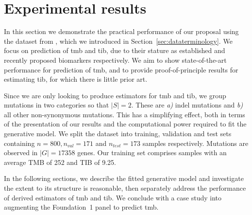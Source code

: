 \documentclass[12pt]{article}
\begin{document}
\section{Experimental results \label{sec:experimentalresults}}
In this section we demonstrate the practical performance of our proposal using the dataset from \citet{campbell_distinct_2016}, which we introduced in Section~\ref{sec:dataterminology}. We focus on prediction of \acrshort{tmb} and \acrshort{tib}, due to their stature as established and recently proposed biomarkers respectively. We aim to show state-of-the-art performance for prediction of \acrshort{tmb}, and to provide proof-of-principle results for estimating \acrshort{tib}, for which there is little prior art.

Since we are only looking to produce estimators for \acrshort{tmb} and \acrshort{tib}, we group mutations in two categories so that $|S|=2$. These are \textit{a)} indel mutations and \textit{b)} all other non-synonymous mutations. This has a simplifying effect, both in terms of the presentation of our results and the computational power required to fit the generative model. We split the dataset into training, validation and test sets containing $n=800, n_{val} = 171$ and $n_{test} = 173$ samples respectively. Mutations are observed in $|G| = 17358$ genes. Our training set comprises samples with an average TMB of 252 and TIB of 9.25. 

In the following sections, we describe the fitted generative model and investigate the extent to its structure is reasonable, then separately address the performance of derived estimators of \acrshort{tmb} and \acrshort{tib}. We conclude with a case study into augmenting the Foundation~1 panel to predict \acrshort{tmb}.
\end{document}
